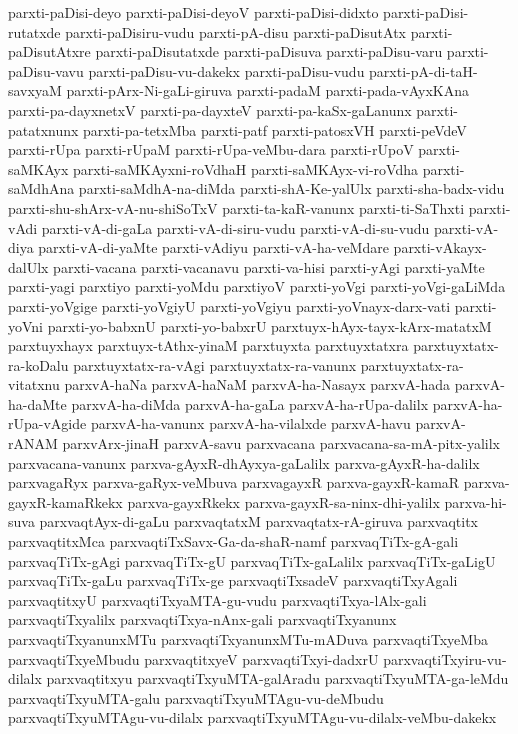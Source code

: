 {parxti-paDisi-deyo
parxti-paDisi-deyoV
parxti-paDisi-didxto
parxti-paDisi-rutatxde
parxti-paDisiru-vudu
parxti-pA-disu
parxti-paDisutAtx
parxti-paDisutAtxre
parxti-paDisutatxde
parxti-paDisuva
parxti-paDisu-varu
parxti-paDisu-vavu
parxti-paDisu-vu-dakekx
parxti-paDisu-vudu
parxti-pA-di-taH-savxyaM
parxti-pArx-Ni-gaLi-giruva
parxti-padaM
parxti-pada-vAyxKAna
parxti-pa-dayxnetxV
parxti-pa-dayxteV
parxti-pa-kaSx-gaLanunx
parxti-patatxnunx
parxti-pa-tetxMba
parxti-patf
parxti-patosxVH
parxti-peVdeV
parxti-rUpa
parxti-rUpaM
parxti-rUpa-veMbu-dara
parxti-rUpoV
parxti-saMKAyx
parxti-saMKAyxni-roVdhaH
parxti-saMKAyx-vi-roVdha
parxti-saMdhAna
parxti-saMdhA-na-diMda
parxti-shA-Ke-yalUlx
parxti-sha-badx-vidu
parxti-shu-shArx-vA-nu-shiSoTxV
parxti-ta-kaR-vanunx
parxti-ti-SaThxti
parxti-vAdi
parxti-vA-di-gaLa
parxti-vA-di-siru-vudu
parxti-vA-di-su-vudu
parxti-vA-diya
parxti-vA-di-yaMte
parxti-vAdiyu
parxti-vA-ha-veMdare
parxti-vAkayx-dalUlx
parxti-vacana
parxti-vacanavu
parxti-va-hisi
parxti-yAgi
parxti-yaMte
parxti-yagi
parxtiyo
parxti-yoMdu
parxtiyoV
parxti-yoVgi
parxti-yoVgi-gaLiMda
parxti-yoVgige
parxti-yoVgiyU
parxti-yoVgiyu
parxti-yoVnayx-darx-vati
parxti-yoVni
parxti-yo-babxnU
parxti-yo-babxrU
parxtuyx-hAyx-tayx-kArx-matatxM
parxtuyxhayx
parxtuyx-tAthx-yinaM
parxtuyxta
parxtuyxtatxra
parxtuyxtatx-ra-koDalu
parxtuyxtatx-ra-vAgi
parxtuyxtatx-ra-vanunx
parxtuyxtatx-ra-vitatxnu
parxvA-haNa
parxvA-haNaM
parxvA-ha-Nasayx
parxvA-hada
parxvA-ha-daMte
parxvA-ha-diMda
parxvA-ha-gaLa
parxvA-ha-rUpa-dalilx
parxvA-ha-rUpa-vAgide
parxvA-ha-vanunx
parxvA-ha-vilalxde
parxvA-havu
parxvA-rANAM
parxvArx-jinaH
parxvA-savu
parxvacana
parxvacana-sa-mA-pitx-yalilx
parxvacana-vanunx
parxva-gAyxR-dhAyxya-gaLalilx
parxva-gAyxR-ha-dalilx
parxvagaRyx
parxva-gaRyx-veMbuva
parxvagayxR
parxva-gayxR-kamaR
parxva-gayxR-kamaRkekx
parxva-gayxRkekx
parxva-gayxR-sa-ninx-dhi-yalilx
parxva-hi-suva
parxvaqtAyx-di-gaLu
parxvaqtatxM
parxvaqtatx-rA-giruva
parxvaqtitx
parxvaqtitxMca
parxvaqtiTxSavx-Ga-da-shaR-namf
parxvaqTiTx-gA-gali
parxvaqTiTx-gAgi
parxvaqTiTx-gU
parxvaqTiTx-gaLalilx
parxvaqTiTx-gaLigU
parxvaqTiTx-gaLu
parxvaqTiTx-ge
parxvaqtiTxsadeV
parxvaqtiTxyAgali
parxvaqtitxyU
parxvaqtiTxyaMTA-gu-vudu
parxvaqtiTxya-lAlx-gali
parxvaqtiTxyalilx
parxvaqtiTxya-nAnx-gali
parxvaqtiTxyanunx
parxvaqtiTxyanunxMTu
parxvaqtiTxyanunxMTu-mADuva
parxvaqtiTxyeMba
parxvaqtiTxyeMbudu
parxvaqtitxyeV
parxvaqtiTxyi-dadxrU
parxvaqtiTxyiru-vu-dilalx
parxvaqtitxyu
parxvaqtiTxyuMTA-galAradu
parxvaqtiTxyuMTA-ga-leMdu
parxvaqtiTxyuMTA-galu
parxvaqtiTxyuMTAgu-vu-deMbudu
parxvaqtiTxyuMTAgu-vu-dilalx
parxvaqtiTxyuMTAgu-vu-dilalx-veMbu-dakekx
}
